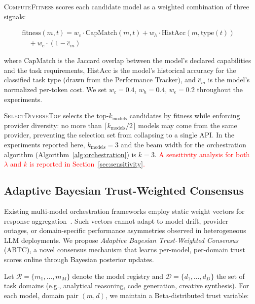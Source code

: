 \documentclass{iopjournal}
\newcommand{\rev}[1]{\textcolor{red}{#1}}
\begin{document}
\noindent\textsc{ComputeFitness} scores each candidate model as a weighted combination of three signals:


\begin{equation}
\begin{split}
\text{fitness}(m, t) = w_c \cdot \text{CapMatch}(m, t) + w_h \cdot \text{HistAcc}(m, \text{type}(t)) \\
 \quad + w_e \cdot (1 - \hat{c}_m)
\end{split}
\label{eq:fitness}
\end{equation}

where $\text{CapMatch}$ is the Jaccard overlap between the model's declared capabilities and the task requirements, $\text{HistAcc}$ is the model's historical accuracy for the classified task type (drawn from the Performance Tracker), and $\hat{c}_m$ is the model's normalized per-token cost. We set $w_c = 0.4$, $w_h = 0.4$, $w_e = 0.2$ throughout the experiments.

\noindent\textsc{SelectDiverseTop} selects the top-$k_{\text{models}}$ candidates by fitness while enforcing provider diversity: no more than $\lceil k_{\text{models}}/2 \rceil$ models may come from the same provider, preventing the selection set from collapsing to a single API. In the experiments reported here, $k_{\text{models}} = 3$ and the beam width for the orchestration algorithm (Algorithm~\ref{alg:orchestration}) is $k = 3$. \rev{A sensitivity analysis for both $\lambda$ and $k$ is reported in Section~\ref{sec:sensitivity}.}

\subsection{Adaptive Bayesian Trust-Weighted Consensus}
\label{sec:abtc}

Existing multi-model orchestration frameworks employ static weight vectors for response aggregation~\cite{AutoGen, MACollab}. Such vectors cannot adapt to model drift, provider outages, or domain-specific performance asymmetries observed in heterogeneous LLM deployments. We propose \emph{Adaptive Bayesian Trust-Weighted Consensus} (ABTC), a novel consensus mechanism that learns per-model, per-domain trust scores online through Bayesian posterior updates.

Let $\mathcal{R} = \{m_1, \ldots, m_M\}$ denote the model registry and $\mathcal{D} = \{d_1, \ldots, d_D\}$ the set of task domains (e.g., analytical reasoning, code generation, creative synthesis). For each model, domain pair $(m, d)$, we maintain a Beta-distributed trust variable:
\end{document}
